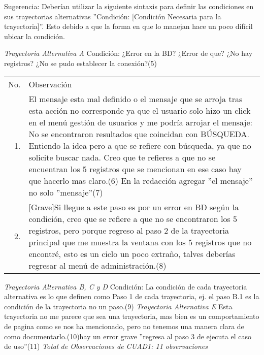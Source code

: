 \documentclass[10pt,spanish]{article}
\providecommand{\tabularnewline}{\\}
\begin{document}
\begin{large}
Sugerencia: Deberían utilizar la siguiente sintaxis para definir las condiciones en sus trayectorias alternativas
''Condición: [Condición Necesaria para la trayectoria]''.
Esto debido a que la forma en que lo manejan hace un poco difícil ubicar la condición.\newline
\newline
\end{large}
 \newpage
\textit{Trayectoria Alternativa A}
Condición: ¿Error en la BD? ¿Error de que? ¿No hay registros? ¿No se pudo establecer la conexión?(5)

\begin{longtable}{rp{8cm}}
No.  & Observación\tabularnewline
1.  & El mensaje esta mal definido o el mensaje que se arroja tras esta acción no corresponde ya que el usuario solo hizo un click en el menú gestión de usuarios y me podría arrojar el mensaje:\newline
No se encontraron resultados que coincidan con BÚSQUEDA.
Entiendo la idea pero a que se refiere con búsqueda, ya que no solicite buscar nada.\newline
Creo que te refieres a que no se encuentran los 5 registros que se mencionan en ese caso hay que hacerlo mas claro.(6)\newline
En la redacción agregar ''el mensaje'' no solo ''mensaje''(7)\tabularnewline
2.  & [Grave]Si llegue a este paso es por un error en BD según la condición, creo que se refiere a que no se encontraron los 5 registros, pero porque regreso al paso 2 de la trayectoria principal que me muestra la ventana con los 5 registros que no encontré, esto es un ciclo un poco extraño, talves deberías regresar al menú de administración.(8)\tabularnewline
\end{longtable}

\textit{Trayectoria Alternativa B, C y D}
Condición: La condición de cada trayectoria alternativa es lo que definen como Paso 1 de cada trayectoria, ej. el paso B.1 es la condición de la trayectoria no un paso.(9)
\newline\newline
\textit{Trayectoria Alternativa E}
Esta trayectoria no me parece que sea una trayectoria, mas bien es un comportamiento de pagina como se nos ha mencionado, pero no tenemos una manera clara de como documentarlo.(10)\newline
[Redacción] hay un error grave ''regresa al paso 3 de ejecuta el caso de uso''(11)
\newline\newline
\textit{Total de Observaciones de CUAD1: 11 observaciones}
\end{document}
